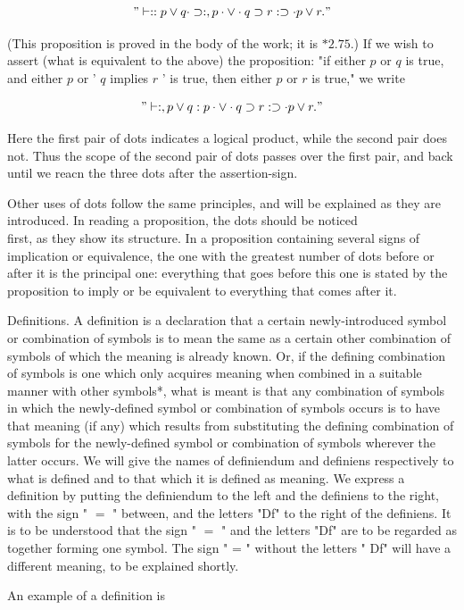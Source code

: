 \documentclass[10pt]{article}
\begin{document}
$$
" \vdash:: p \vee q \cdot \supset:, p \cdot \vee \cdot q \supset r: \supset \cdot p \vee r . "
$$

(This proposition is proved in the body of the work; it is $* 2.75$.) If we wish to assert (what is equivalent to the above) the proposition: "if either $p$ or $q$ is true, and either $p$ or ' $q$ implies $r$ ' is true, then either $p$ or $r$ is true," we write

$$
" \vdash:, p \vee q: p \cdot \vee \cdot q \supset r: \supset \cdot p \vee r . "
$$

Here the first pair of dots indicates a logical product, while the second pair does not. Thus the scope of the second pair of dots passes over the first pair, and back until we reacn the three dots after the assertion-sign.

Other uses of dots follow the same principles, and will be explained as they are introduced. In reading a proposition, the dots should be noticed\\
first, as they show its structure. In a proposition containing several signs of implication or equivalence, the one with the greatest number of dots before or after it is the principal one: everything that goes before this one is stated by the proposition to imply or be equivalent to everything that comes after it.

Definitions. A definition is a declaration that a certain newly-introduced symbol or combination of symbols is to mean the same as a certain other combination of symbols of which the meaning is already known. Or, if the defining combination of symbols is one which only acquires meaning when combined in a suitable manner with other symbols*, what is meant is that any combination of symbols in which the newly-defined symbol or combination of symbols occurs is to have that meaning (if any) which results from substituting the defining combination of symbols for the newly-defined symbol or combination of symbols wherever the latter occurs. We will give the names of definiendum and definiens respectively to what is defined and to that which it is defined as meaning. We express a definition by putting the definiendum to the left and the definiens to the right, with the sign " $=$ " between, and the letters "Df" to the right of the definiens. It is to be understood that the sign " $=$ " and the letters "Df" are to be regarded as together forming one symbol. The sign " = " without the letters " Df" will have a different meaning, to be explained shortly.

An example of a definition is
\end{document}
